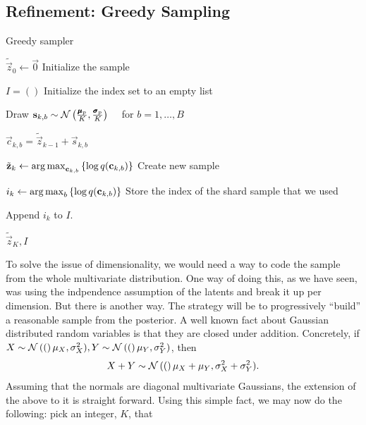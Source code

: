 \subsection{Refinement: Greedy Sampling}
\begin{algorithm}
  \caption{Greedy sampler}
  \label{alg:greedy_sampler}
  \begin{algorithmic}

    \State $\tilde{\vec{z}}_0 \gets \vec{0}$
    \Comment Initialize the sample

    \State $I = ()$
    \Comment Initialize the index set to an empty list

    \State Draw $\mathbf{s}_{k, b} \sim \mathcal{N}\left( \frac{\pmb{\mu}_p}{K}, \frac{\pmb{\sigma}_p}{K} \right)
    \quad$ for $b = 1,\hdots,B$
    
    \State $\vec{c}_{k, b} = \tilde{\vec{z}}_{k - 1} + \vec{s}_{k, b}$

    \State $\tilde{\mathbf{z}}_k \gets \operatorname*{arg\,max}_{\mathbf{c}_{k, b}} \left\{ \log q(\mathbf{c}_{k, b}) \right\}$
    \Comment Create new sample

    \State $i_k \gets \operatorname*{arg\,max}_{b} \left\{ \log q(\mathbf{c}_{k, b}) \right\}$
    \Comment Store the index of the shard sample that we used

    \State Append $i_k$ to $I$.
    
    \EndFor

    \State \Return $\tilde{\vec{z}}_K, I$
    
    \EndProcedure
  \end{algorithmic}
\end{algorithm}
\par
To solve the issue of dimensionality, we would need a way to code the sample
from the whole multivariate distribution. One way of doing this, as we have
seen, was using the indpendence assumption of the latents and break it up per
dimension. But there is another way. The strategy will be to progressively ``build''
a reasonable sample from the posterior. A well known fact about Gaussian
distributed random variables is that they are closed under addition. Concretely,
if $X \sim \mathcal{N}\left( ( \right)\mu_X, \sigma^2_X), Y \sim \mathcal{N}\left( ( \right)\mu_Y, \sigma^2_Y)$, then
\[
  X + Y \sim \mathcal{N}\left( ( \right)\mu_X + \mu_Y, \sigma_X^2 + \sigma_Y^2).
\]
Assuming that the normals are diagonal multivariate Gaussians, the extension of
the above to it is straight forward.
Using this simple fact, we may now do the following: pick an integer, $K$, that
